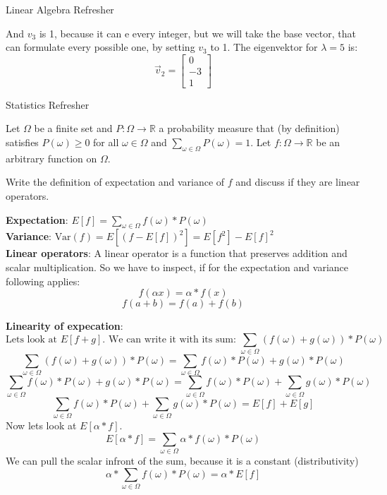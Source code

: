 \documentclass[
	english,
        solution=true
	]{tudaexercise}
\newcommand{\R}{\mathbb{R}}
\begin{document}
\begin{task}[points=28]{Linear Algebra Refresher}
\begin{subtask} [points=5,title=Matrix Decomposition]
\begin{solution}
    And $v_3$ is 1, because it can e every integer, but we will take the base vector, that can formulate every possible one, by setting $v_3 $ to 1. The eigenvektor for $\lambda=5$ is:
    \[\vec{v}_2=\begin{bmatrix}
        0 \\-3 \\ 1
    \end{bmatrix}\]
    
    
    
\end{solution}
\end{subtask}
\end{task}

\newpage

\begin{task}[points=15]{Statistics Refresher}

\begin{subtask}[points=4,title=Expectation and Variance]


Let $\Omega$ be a finite set and $P:\Omega\rightarrow\R$ a probability measure
that (by definition) satisfies $P(\omega)\geq0$ for all $\omega\in\Omega$ and
$\sum_{\omega\in\Omega}P(\omega)=1$.  Let $f:\Omega\rightarrow\R$ be an
arbitrary function on $\Omega$.

Write the definition of expectation and variance of $f$ and discuss if they are linear operators.


\begin{solution}

\textbf{Expectation}: $E[f]=\sum_{\omega\in \Omega} f(\omega) * P(\omega)$ \\ 
\textbf{Variance}: $\text{Var}(f)=E[(f-E[f])^2]=E[f^2]-E[f]^2$\\

\textbf{Linear operators}: A linear operator is a function that preserves addition and scalar multiplication. So we have to inspect, if for the expectation and variance following applies: 
\[f(\alpha x)=\alpha * f(x)\]
\[f(a+b)=f(a)+f(b)\]

\textbf{Linearity of expecation}:
\[\text{Lets look at } E[f+g]. \text{ We can write it with its sum: } \sum_{\omega \in \Omega} (f(\omega)+g(\omega))*P(\omega)\]
\[\sum_{\omega \in \Omega} (f(\omega)+g(\omega))*P(\omega)=\sum_{\omega \in \Omega} f(\omega)*P(\omega)+g(\omega)*P(\omega)\]
\[\sum_{\omega \in \Omega} f(\omega)*P(\omega)+g(\omega)*P(\omega)=\sum_{\omega \in \Omega} f(\omega)*P(\omega) + \sum_{\omega \in \Omega} g(\omega)*P(\omega)\]
\[\sum_{\omega \in \Omega} f(\omega)*P(\omega) + \sum_{\omega \in \Omega} g(\omega)*P(\omega) = E[f]+E[g]\]
Now lets look at $E[\alpha * f]$. 
\[E[\alpha * f]=\sum_{\omega \in \Omega} \alpha*f(\omega)*P(\omega)\]
We can pull the scalar infront of the sum, because it is a constant (distributivity)
\[\alpha * \sum_{\omega \in \Omega} f(\omega)*P(\omega)=\alpha * E[f]\]


\end{solution}
\end{subtask}
\end{task}
\end{document}
